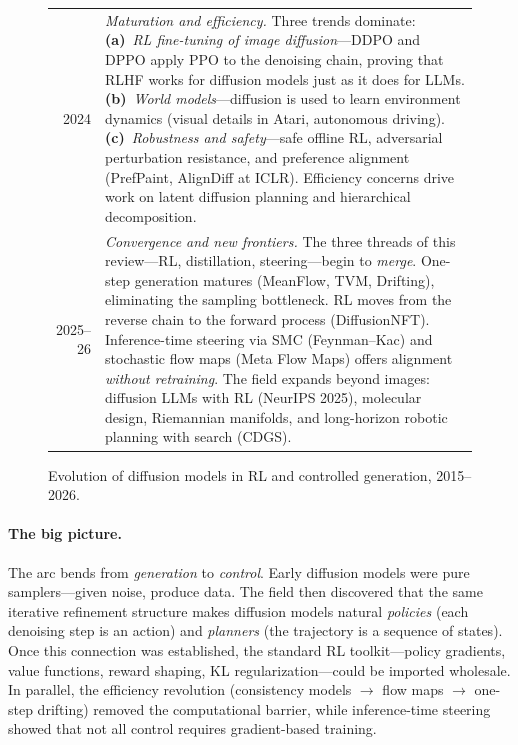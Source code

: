 \documentclass[11pt]{article}
\begin{document}
\begin{figure}[h]
\begin{tabular}{@{}r p{}@{}}
2024 & \emph{Maturation and efficiency.}
Three trends dominate:
\textbf{(a)}~\emph{RL fine-tuning of image diffusion}---DDPO and DPPO \citep{black2024training,fan2024reinforcement} apply PPO to the denoising chain, proving that RLHF works for diffusion models just as it does for LLMs.
\textbf{(b)}~\emph{World models}---diffusion is used to learn environment dynamics (visual details in Atari, autonomous driving).
\textbf{(c)}~\emph{Robustness and safety}---safe offline RL, adversarial perturbation resistance, and preference alignment (PrefPaint, AlignDiff at ICLR).
Efficiency concerns drive work on latent diffusion planning and hierarchical decomposition. \\[4pt]

2025--26 & \emph{Convergence and new frontiers.}
The three threads of this review---RL, distillation, steering---begin to \emph{merge}.
One-step generation matures (MeanFlow, TVM, Drifting), eliminating the sampling bottleneck.
RL moves from the reverse chain to the forward process (DiffusionNFT).
Inference-time steering via SMC (Feynman--Kac) and stochastic flow maps (Meta Flow Maps) offers alignment \emph{without retraining}.
The field expands beyond images: diffusion LLMs with RL (NeurIPS 2025), molecular design, Riemannian manifolds, and long-horizon robotic planning with search (CDGS). \\
\bottomrule
\end{tabular}
\caption{Evolution of diffusion models in RL and controlled generation, 2015--2026.}
\label{fig:timeline}
\end{figure}

\paragraph{The big picture.}
The arc bends from \emph{generation} to \emph{control}.
Early diffusion models were pure samplers---given noise, produce data.
The field then discovered that the same iterative refinement structure makes diffusion models natural \emph{policies} (each denoising step is an action) and \emph{planners} (the trajectory is a sequence of states).
Once this connection was established, the standard RL toolkit---policy gradients, value functions, reward shaping, KL regularization---could be imported wholesale.
In parallel, the efficiency revolution (consistency models $\to$ flow maps $\to$ one-step drifting) removed the computational barrier, while inference-time steering showed that not all control requires gradient-based training.
\end{document}
